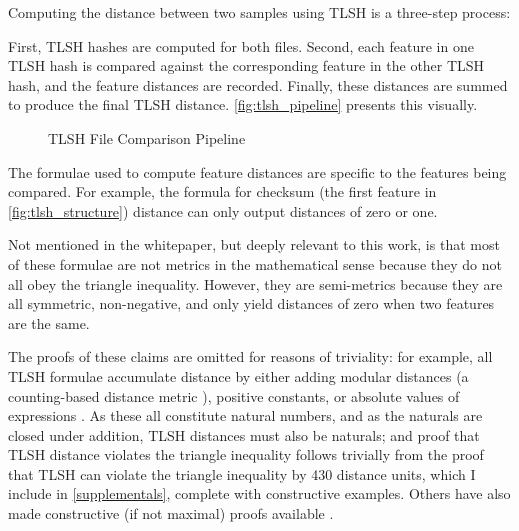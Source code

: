 \documentclass[5p,final]{elsarticle}
\begin{document}
Computing the distance between two samples using TLSH is a three-step
process:

First, TLSH hashes are computed for both files. Second, each
feature in one TLSH hash is compared against the corresponding feature
in the other TLSH hash, and the feature distances are recorded. Finally,
these distances are summed to produce the final TLSH distance.
\autoref{fig:tlsh_pipeline} presents this visually.

\begin{figure}[H]
	\centering
	\begin{adjustbox}{width=\columnwidth}
	\end{adjustbox}
	\caption{TLSH File Comparison Pipeline}
	\label{fig:tlsh_pipeline}
\end{figure}

The formulae used to compute feature distances are specific to the features
being compared. For example, the formula for checksum (the first feature in
\autoref{fig:tlsh_structure}) distance can only output distances of zero or one.

Not mentioned in the whitepaper, but deeply relevant to this work, is
that most of these formulae are not metrics in the mathematical sense
because they do not all obey the triangle inequality. However, they are
semi-metrics because they are all symmetric, non-negative, and only yield
distances of zero when two features are the same.

The proofs of these claims are omitted for reasons of triviality: for example,
all TLSH formulae accumulate distance by either adding modular distances
(a counting-based distance metric \cite{oliverTLSHLocalitySensitive2013}),
positive constants, or absolute values of expressions
\cite{oliverTLSHLocalitySensitive2013}. As these all constitute
natural numbers, and as the naturals are closed under addition, TLSH distances
must also be naturals; and proof that TLSH distance violates the triangle
inequality follows trivially from the proof that TLSH can violate the triangle
inequality by 430 distance units, which I include in \ref{supplementals},
complete with constructive examples. Others have also made constructive
(if not maximal) proofs available \cite{baggettTLSHDistanceMetric2023}.
\end{document}
